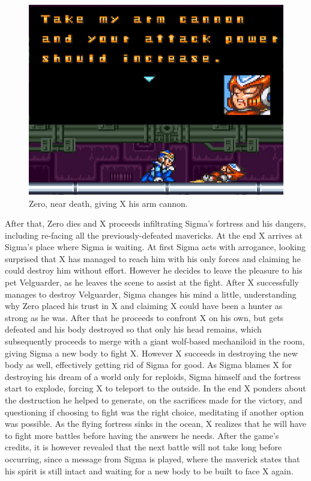 \begin{figure}[htp]
	\centering
	\includegraphics[width=0.5\linewidth]{figures/X1/Zero_cannon.jpg}
	\caption{Zero, near death, giving X his arm cannon.}
\end{figure}
After that, Zero dies and X proceeds infiltrating Sigma's fortress and his dangers, including re-facing all the previously-defeated mavericks. At the end X arrives at Sigma's place where Sigma is waiting. At first Sigma acts with arrogance, looking surprised that X has managed to reach him with his only forces and claiming he could destroy him without effort. However he decides to leave the pleasure to his pet Velguarder, as he leaves the scene to assist at the fight. After X successfully manages to destroy Velguarder, Sigma changes his mind a little, understanding why Zero placed his trust in X and claiming X could have been a hunter as strong as he was. After that he proceeds to confront X on his own, but gets defeated and his body destroyed so that only his head remains, which subsequently proceeds to merge with a giant wolf-based mechaniloid in the room, giving Sigma a new body to fight X. However X succeeds in destroying the new body as well, effectively getting rid of Sigma for good. As Sigma blames X for destroying his dream of a world only for reploids, Sigma himself and the fortress start to explode, forcing X to teleport to the outside. In the end X ponders about the destruction he helped to generate, on the sacrifices made for the victory, and questioning if choosing to fight was the right choice, meditating if another option was possible. As the flying fortress sinks in the ocean, X realizes that he will have to fight more battles before having the answers he needs. 
After the game's credits, it is however revealed that the next battle will not take long before occurring, since a message from Sigma is played, where the maverick states that his spirit is still intact and waiting for a new body to be built to face X again.

